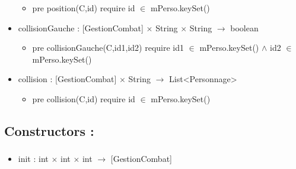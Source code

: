 \documentclass[11pt]{article}
\begin{document}
\begin{itemize}
\begin{itemize}

\item pre position(C,id) require id $\in$ mPerso.keySet()\\
\label{sec-1.4.1.6.1}


\end{itemize} %

\item collisionGauche : [GestionCombat] $\times$ String $\times$ String $\to$ boolean\\
\label{sec-1.4.1.7}

\begin{itemize}

\item pre collisionGauche(C,id1,id2) require  id1 $\in$ mPerso.keySet() $\wedge$ id2 $\in$ mPerso.keySet()\\
\label{sec-1.4.1.7.1}


\end{itemize} %

\item collision : [GestionCombat] $\times$ String $\to$ List<Personnage>\\
\label{sec-1.4.1.8}

\begin{itemize}

\item pre collision(C,id) require id $\in$ mPerso.keySet()\\
\label{sec-1.4.1.8.1}




\end{itemize} %
\end{itemize} %
\subsection{Constructors :}
\label{sec-1.5}

\subsubsection{}

\begin{itemize}

\item init : int $\times$ int $\times$ int $\to$ [GestionCombat]\\
\label{sec-1.5.1.1}





\end{itemize} %
\end{document}

